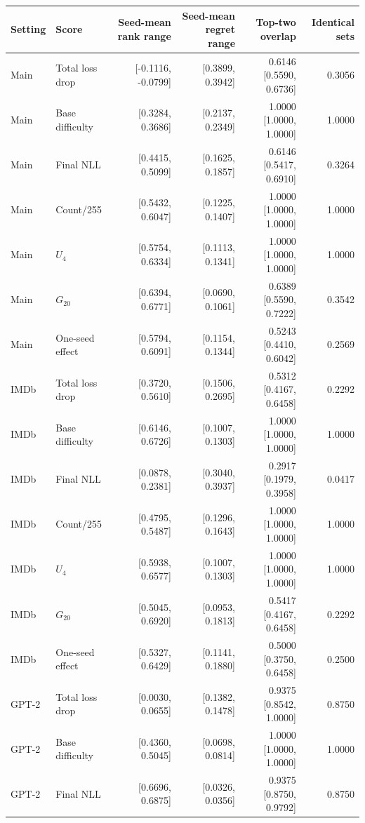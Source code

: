 \begin{table}[tp]
\centering
\footnotesize
\setlength{\tabcolsep}{3pt}
\begin{tabular}{llrrrr}
\toprule
Setting & Score & Seed-mean rank range & Seed-mean regret range & Top-two overlap & Identical sets \\
\midrule
Main & Total loss drop & [-0.1116, -0.0799] & [0.3899, 0.3942] & 0.6146 [0.5590, 0.6736] & 0.3056 \\
Main & Base difficulty & [0.3284, 0.3686] & [0.2137, 0.2349] & 1.0000 [1.0000, 1.0000] & 1.0000 \\
Main & Final NLL & [0.4415, 0.5099] & [0.1625, 0.1857] & 0.6146 [0.5417, 0.6910] & 0.3264 \\
Main & Count/255 & [0.5432, 0.6047] & [0.1225, 0.1407] & 1.0000 [1.0000, 1.0000] & 1.0000 \\
Main & $U_4$ & [0.5754, 0.6334] & [0.1113, 0.1341] & 1.0000 [1.0000, 1.0000] & 1.0000 \\
Main & $G_{20}$ & [0.6394, 0.6771] & [0.0690, 0.1061] & 0.6389 [0.5590, 0.7222] & 0.3542 \\
Main & One-seed effect & [0.5794, 0.6091] & [0.1154, 0.1344] & 0.5243 [0.4410, 0.6042] & 0.2569 \\
IMDb & Total loss drop & [0.3720, 0.5610] & [0.1506, 0.2695] & 0.5312 [0.4167, 0.6458] & 0.2292 \\
IMDb & Base difficulty & [0.6146, 0.6726] & [0.1007, 0.1303] & 1.0000 [1.0000, 1.0000] & 1.0000 \\
IMDb & Final NLL & [0.0878, 0.2381] & [0.3040, 0.3937] & 0.2917 [0.1979, 0.3958] & 0.0417 \\
IMDb & Count/255 & [0.4795, 0.5487] & [0.1296, 0.1643] & 1.0000 [1.0000, 1.0000] & 1.0000 \\
IMDb & $U_4$ & [0.5938, 0.6577] & [0.1007, 0.1303] & 1.0000 [1.0000, 1.0000] & 1.0000 \\
IMDb & $G_{20}$ & [0.5045, 0.6920] & [0.0953, 0.1813] & 0.5417 [0.4167, 0.6458] & 0.2292 \\
IMDb & One-seed effect & [0.5327, 0.6429] & [0.1141, 0.1880] & 0.5000 [0.3750, 0.6458] & 0.2500 \\
GPT-2 & Total loss drop & [0.0030, 0.0655] & [0.1382, 0.1478] & 0.9375 [0.8542, 1.0000] & 0.8750 \\
GPT-2 & Base difficulty & [0.4360, 0.5045] & [0.0698, 0.0814] & 1.0000 [1.0000, 1.0000] & 1.0000 \\
GPT-2 & Final NLL & [0.6696, 0.6875] & [0.0326, 0.0356] & 0.9375 [0.8750, 0.9792] & 0.8750 \\

\end{tabular}
\end{table}
